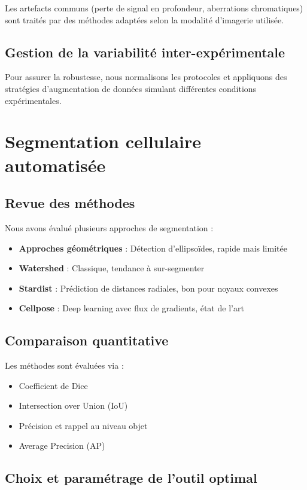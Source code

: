 Les artefacts communs (perte de signal en profondeur, aberrations chromatiques) sont traités par des méthodes adaptées selon la modalité d'imagerie utilisée.

\subsection{Gestion de la variabilité inter-expérimentale}

Pour assurer la robustesse, nous normalisons les protocoles et appliquons des stratégies d'augmentation de données simulant différentes conditions expérimentales.

\section{Segmentation cellulaire automatisée}

\subsection{Revue des méthodes}

Nous avons évalué plusieurs approches de segmentation :
\begin{itemize}
    \item \textbf{Approches géométriques} : Détection d'ellipsoïdes, rapide mais limitée
    \item \textbf{Watershed} : Classique, tendance à sur-segmenter
    \item \textbf{Stardist} : Prédiction de distances radiales, bon pour noyaux convexes
    \item \textbf{Cellpose} : Deep learning avec flux de gradients, état de l'art
\end{itemize}

\subsection{Comparaison quantitative}

Les méthodes sont évaluées via :
\begin{itemize}
    \item Coefficient de Dice
    \item Intersection over Union (IoU)
    \item Précision et rappel au niveau objet
    \item Average Precision (AP)
\end{itemize}

\subsection{Choix et paramétrage de l'outil optimal}

